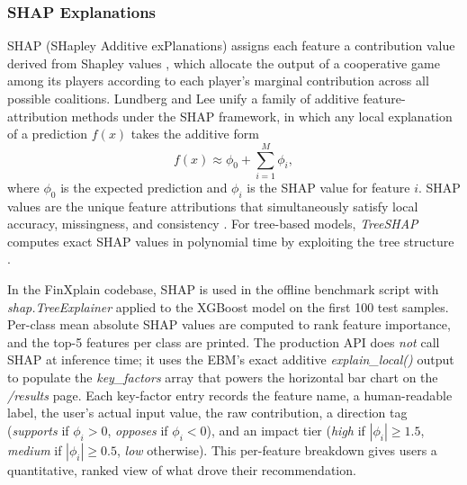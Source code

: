 \documentclass{icsthesis}
\begin{document}
\begin{mainmatter}
				\subsubsection{SHAP Explanations}
					SHAP (SHapley Additive exPlanations) assigns each feature a contribution value derived from Shapley values \cite{ref70}, which allocate the output of a cooperative game among its players according to each player's marginal contribution across all possible coalitions. Lundberg and Lee \cite{ref18} unify a family of additive feature-attribution methods under the SHAP framework, in which any local explanation of a prediction $f(x)$ takes the additive form
					\begin{equation*}
					    f(x) \approx \phi_0 + \sum_{i=1}^{M} \phi_i,
					\end{equation*}
					where $\phi_0$ is the expected prediction and $\phi_i$ is the SHAP value for feature $i$. SHAP values are the unique feature attributions that simultaneously satisfy local accuracy, missingness, and consistency \cite{ref18}. For tree-based models, \emph{TreeSHAP} computes exact SHAP values in polynomial time by exploiting the tree structure \cite{ref69}.

					In the FinXplain codebase, SHAP is used in the offline benchmark script with \emph{shap.TreeExplainer} applied to the XGBoost model on the first 100 test samples. Per-class mean absolute SHAP values are computed to rank feature importance, and the top-5 features per class are printed. The production API does \emph{not} call SHAP at inference time; it uses the EBM's exact additive \emph{explain\_local()} output to populate the \emph{key\_factors} array that powers the horizontal bar chart on the \emph{/results} page. Each key-factor entry records the feature name, a human-readable label, the user's actual input value, the raw contribution, a direction tag (\emph{supports} if $\phi_i > 0$, \emph{opposes} if $\phi_i < 0$), and an impact tier (\emph{high} if $|\phi_i| \geq 1.5$, \emph{medium} if $|\phi_i| \geq 0.5$, \emph{low} otherwise). This per-feature breakdown gives users a quantitative, ranked view of what drove their recommendation.


\end{mainmatter}
\end{document}
